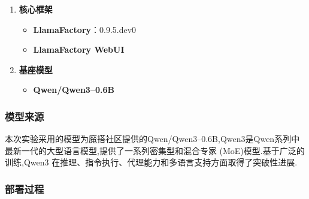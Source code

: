 \documentclass[12pt]{ctexart}
\begin{document}
\begin{enumerate}
    \item \textbf{核心框架}

          \begin{itemize}

              \item \textbf{LlamaFactory}：0.9.5.dev0

              \item \textbf{LlamaFactory WebUI}

          \end{itemize}

    \item \textbf{基座模型}

          \begin{itemize}

              \item \textbf{Qwen/Qwen3--0.6B}

          \end{itemize}

\end{enumerate}

\subsubsection{模型来源}

本次实验采用的模型为魔搭社区提供的Qwen/Qwen3--0.6B,Qwen3是Qwen系列中最新一代的大型语言模型,提供了一系列密集型和混合专家 (MoE)模型.基于广泛的训练,Qwen3 在推理、指令执行、代理能力和多语言支持方面取得了突破性进展.

\subsubsection{部署过程}
\end{document}
